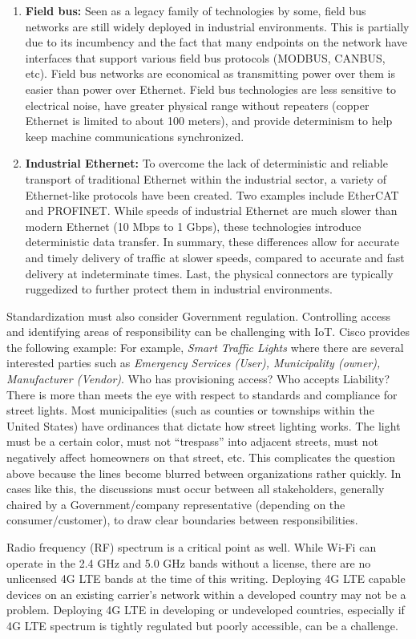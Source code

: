\begin{enumerate}
  \item	\textbf{Field bus:} Seen as a legacy family of technologies by some,
  field bus networks are still widely deployed in industrial environments.
  This is partially due to its incumbency and the fact that many endpoints on
  the network have interfaces that support various field bus protocols
  (MODBUS, CANBUS, etc). Field bus networks are economical as transmitting
  power over them is easier than power over Ethernet. Field bus technologies
  are less sensitive to electrical noise, have greater physical range without
  repeaters (copper Ethernet is limited to about 100 meters), and provide
  determinism to help keep machine communications synchronized.
  \item	\textbf{Industrial Ethernet:} To overcome the lack of deterministic
  and reliable transport of traditional Ethernet within the industrial sector,
  a variety of Ethernet-like protocols have been created. Two examples include
  EtherCAT and PROFINET\@. While speeds of industrial Ethernet are much slower
  than modern Ethernet (10 Mbps to 1 Gbps), these technologies introduce
  deterministic data transfer. In summary, these differences allow for
  accurate and timely delivery of traffic at slower speeds, compared to
  accurate and fast delivery at indeterminate times. Last, the physical
  connectors are typically ruggedized to further protect them in industrial
  environments.
\end{enumerate}

Standardization must also consider Government regulation. Controlling access
and identifying areas of responsibility can be challenging with IoT. Cisco
provides the following example:  For example, \textit{Smart Traffic Lights}
where there are several interested parties such as \textit{Emergency Services
(User), Municipality (owner), Manufacturer (Vendor)}. Who has provisioning
access? Who accepts Liability? \\

There is more than meets the eye with respect to standards and compliance for
street lights. Most municipalities (such as counties or townships within the
United States) have ordinances that dictate how street lighting works. The
light must be a certain color, must not ``trespass'' into adjacent streets,
must not negatively affect homeowners on that street, etc. This complicates
the question above because the lines become blurred between organizations
rather quickly. In cases like this, the discussions must occur between all
stakeholders, generally chaired by a Government/company representative
(depending on the consumer/customer), to draw clear boundaries between
responsibilities.

Radio frequency (RF) spectrum is a critical point as well. While Wi-Fi can
operate in the 2.4 GHz and 5.0 GHz bands without a license, there are no
unlicensed 4G LTE bands at the time of this writing. Deploying 4G LTE capable
devices on an existing carrier’s network within a developed country may not be
a problem. Deploying 4G LTE in developing or undeveloped countries, especially
if 4G LTE spectrum is tightly regulated but poorly accessible, can be a challenge.
